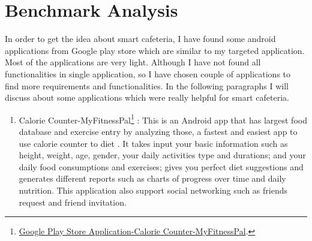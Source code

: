 \section{Benchmark Analysis}
\label{sec:RMA}
In order to get the idea about smart cafeteria, I have found some android
applications from Google play store which are similar to my targeted
application. Most of the applications are very light. Although I have not found
all functionalities in single application, so I have chosen couple of
applications to find more requirements and functionalities. In the following
paragraphs I will discuss about some applications which were really helpful for smart
cafeteria.

\begin{enumerate}
\item Calorie Counter-MyFitnessPal\footnote{
\href{https://play.google.com/store/apps/details?id=com.myfitnesspal.android}{Google
Play Store Application-Calorie Counter-MyFitnessPal}.} : This is an Android app
that has largest food database and exercise entry by analyzing those, a fastest
and easiest app to use calorie counter  to diet . It takes input your basic
information such as height, weight, age, gender, your daily activities type and
durations; and your daily food consumptions and exercises; gives you perfect
diet suggestions and generates different reports such as charts of progress over
time and daily nutrition. This application also support social networking such
as friends request and friend invitation.
\begin{figure}[h!t]
\centering
{}
\end{figure}
\end{enumerate}
